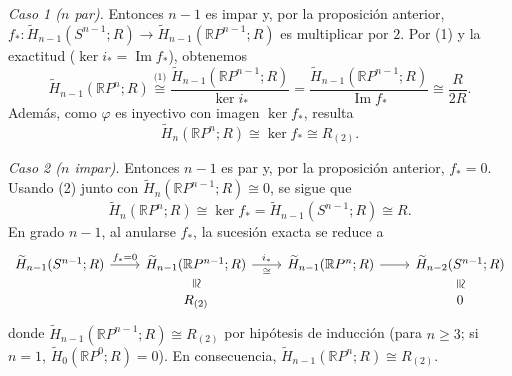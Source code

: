 \begin{dem}
\smallskip
\noindent\textit{Caso 1 ($n$ par).} Entonces $n - 1$ es impar y, por la proposición anterior, $f_* \colon \widetilde{H}_{n-1}(S^{n-1}; R) \to \widetilde{H}_{n-1}(\mathbb{R}P^{n-1}; R)$ es multiplicar por $2$. Por (1) y la exactitud ($\ker i_* = \operatorname{Im} f_*$), obtenemos
\[
\widetilde{H}_{n-1}(\mathbb{R}P^n; R)
\overset{\text{(1)}}{\cong}
\frac{\widetilde{H}_{n-1}(\mathbb{R}P^{n-1}; R)}{\ker i_*}
= \frac{\widetilde{H}_{n-1}(\mathbb{R}P^{n-1}; R)}{\operatorname{Im} f_*}
\cong \frac{R}{2R}.
\]
Además, como $\varphi$ es inyectivo con imagen $\ker f_*$, resulta
\[
\widetilde{H}_n(\mathbb{R}P^n; R) \cong \ker f_* \cong R_{(2)}.
\]

\smallskip
\noindent\textit{Caso 2 ($n$ impar).} Entonces $n - 1$ es par y, por la proposición anterior, $f_* = 0$. Usando (2) junto con $\widetilde{H}_n(\mathbb{R}P^{n-1}; R) \cong 0$, se sigue que
\[
\widetilde{H}_n(\mathbb{R}P^n; R) \cong \ker f_* = \widetilde{H}_{n-1}(S^{n-1}; R) \cong R.
\]
En grado $n - 1$, al anularse $f_*$, la sucesión exacta se reduce a
\[
\begin{tikzcd}[column sep=2.2em, row sep=1.0em]
\widetilde{H}_{n-1}(S^{n-1}; R) \arrow[r, "f_* = 0"]
& \widetilde{H}_{n-1}(\mathbb{R}P^{n-1}; R)
    \arrow[r, "i_*", "\cong"']
    \arrow[d, phantom, "\cong"{description, sloped, inner sep=1pt}]
& \widetilde{H}_{n-1}(\mathbb{R}P^n; R) \arrow[r]
& \widetilde{H}_{n-2}(S^{n-1}; R)
    \arrow[d, phantom, "\cong"{description, sloped, inner sep=1pt}] \\
& R_{(2)} & & 0
\end{tikzcd}
\]
donde $\widetilde{H}_{n-1}(\mathbb{R}P^{n-1}; R) \cong R_{(2)}$ por hipótesis de inducción (para $n \geq 3$; si $n = 1$, $\widetilde{H}_0(\mathbb{R}P^0; R) = 0$). En consecuencia, $\widetilde{H}_{n-1}(\mathbb{R}P^n; R) \cong R_{(2)}$.
\end{dem}

